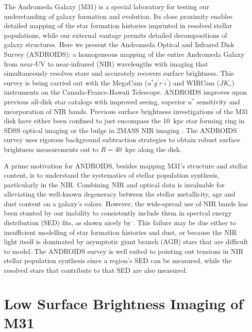 \documentclass[11pt,twoside]{article}
\begin{document}
The Andromeda Galaxy (M31) is a special laboratory for testing our understanding of galaxy formation and evolution.
Its close proximity enables detailed mapping of the star formation histories imprinted in resolved stellar populations, while our external vantage permits detailed decompositions of galaxy structures.
Here we present the Andromeda Optical and Infrared Disk Survey (ANDROIDS): a homogeneous mapping of the entire Andromeda Galaxy from near-UV to near-infrared (NIR) wavelengths with imaging that simultaneously resolves stars and accurately recovers surface brightness.
This survey is being carried out with the MegaCam ($u^*g^\prime r^\prime i^\prime$) and WIRCam ($JK_s$) instruments on the Canada-France-Hawaii Telescope.
ANDROIDS improves upon previous all-disk star catalogs \citep[e.g., the Local Group Galaxy Survey;][]{Massey:2006} with improved seeing, superior $u^*$ sensitivity and incorporation of NIR bands.
Previous surface brightness investigations of the M31 disk have either been confined to just encompass the 10~kpc star forming ring in SDSS optical imaging \citep{Tamm:2012} or the bulge in 2MASS NIR imaging \cite{Beaton:2007}.
The ANDROIDS survey uses rigorous background subtraction strategies to obtain robust surface brightness measurements out to $R=40$~kpc along the disk.

A prime motivation for ANDROIDS, besides mapping M31's structure and stellar content, is to understand the systematics of stellar population synthesis, particularly in the NIR.
Combining NIR and optical data is invaluable for alleviating the well-known degeneracy between the stellar metallicity, age and dust content on a galaxy's colors.
However, the wide-spread use of NIR bands has been stunted by our inability to consistently include them in spectral energy distribution (SED) fits, as shown nicely by \cite{Taylor:2011}.
This failure may be due either to insufficient modelling of star formation histories and dust, or because the NIR light itself is dominated by asymptotic giant branch (AGB) stars that are difficult to model.
The ANDROIDS survey is well suited to pointing out tensions in NIR stellar population synthesis since a region's SED can be measured, while the resolved stars that contribute to that SED are also measured.

\section{Low Surface Brightness Imaging of M31}
\end{document}

